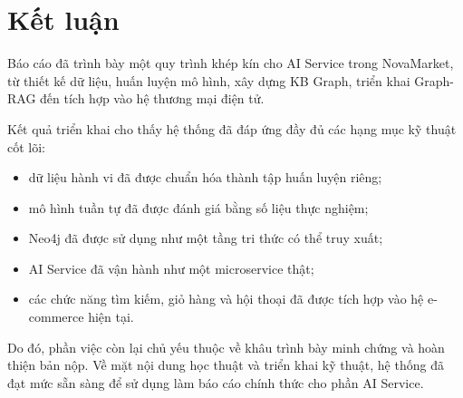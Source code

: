 \documentclass[12pt,a4paper]{article}
\begin{document}
\section{Kết luận}
Báo cáo đã trình bày một quy trình khép kín cho AI Service trong NovaMarket, từ thiết kế dữ liệu, huấn luyện mô hình, xây dựng KB Graph, triển khai Graph-RAG đến tích hợp vào hệ thương mại điện tử.

Kết quả triển khai cho thấy hệ thống đã đáp ứng đầy đủ các hạng mục kỹ thuật cốt lõi:
\begin{itemize}
  \item dữ liệu hành vi đã được chuẩn hóa thành tập huấn luyện riêng;
  \item mô hình tuần tự đã được đánh giá bằng số liệu thực nghiệm;
  \item Neo4j đã được sử dụng như một tầng tri thức có thể truy xuất;
  \item AI Service đã vận hành như một microservice thật;
  \item các chức năng tìm kiếm, giỏ hàng và hội thoại đã được tích hợp vào hệ e-commerce hiện tại.
\end{itemize}

Do đó, phần việc còn lại chủ yếu thuộc về khâu trình bày minh chứng và hoàn thiện bản nộp. Về mặt nội dung học thuật và triển khai kỹ thuật, hệ thống đã đạt mức sẵn sàng để sử dụng làm báo cáo chính thức cho phần AI Service.
\end{document}
